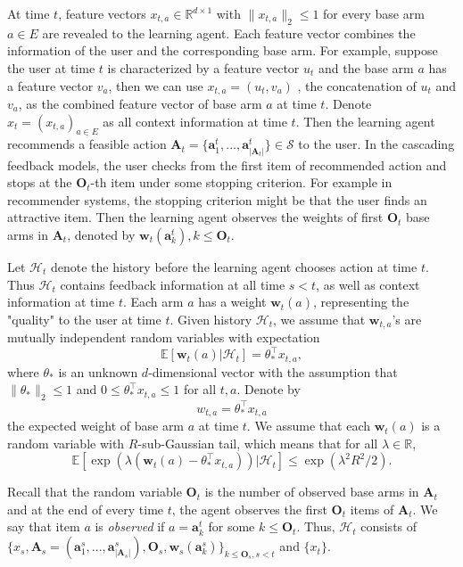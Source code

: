 \documentclass{article}
\newcommand{\EE}{\mathbb{E}}
\newcommand{\RR}{\mathbb{R}}
\newcommand{\bA}{\mathbf{A}}
\newcommand{\ba}{\mathbf{a}}
\newcommand{\bO}{\mathbf{O}}
\newcommand{\bw}{\mathbf{w}}
\newcommand{\cH}{\mathcal{H}}
\newcommand{\cS}{\mathcal{S}}
\newcommand{\abs}[1]{\left| #1 \right|}
\newcommand{\norm}[1]{\| #1 \|}
\begin{document}
At time $t$, feature vectors $x_{t,a} \in \RR^{d \times 1}$ with $\norm{x_{t,a}}_2 \leq 1$ for every base arm $a \in E$ are revealed to the learning agent. Each feature vector combines the information of the user and the corresponding base arm. For example, suppose the user at time $t$ is characterized by a feature vector $u_t$ and the base arm $a$ has a feature vector $v_a$, then we can use $x_{t,a} = (u_t, v_a)$ , the concatenation of $u_t$ and $v_a$, as the combined feature vector of base arm $a$ at time $t$. Denote $x_t = (x_{t,a})_{a \in E}$ as all context information at time $t$. Then the learning agent recommends a feasible action $\bA_t=\{ \ba_{1}^t,...,\ba_{\abs{\bA_t}}^t \} \in \cS$ to the user. In the cascading feedback models, the user checks from the first item of recommended action and stops at the $\bO_t$-th item under some stopping criterion. For example in recommender systems, the stopping criterion might be that the user finds an attractive item. Then the learning agent observes the weights of first $\bO_t$ base arms in $\bA_t$, denoted by $\bw_t(\ba_k^t), k \leq \bO_t$. 

Let $\cH_t$ denote the history before the learning agent chooses action at time $t$. Thus $\cH_t$ contains feedback information at all time $s < t$, as well as context information at time $t$. Each arm $a$ has a weight $\bw_t(a)$, representing the "quality" to the user at time $t$. Given history $\cH_t$, we assume that $\bw_{t,a}$'s are mutually independent random variables with expectation
\begin{equation} %
\label{eq:expectation}
\EE[\bw_{t}(a) | \cH_t] = \theta_{\ast}^{\top} x_{t,a},
\end{equation}
where $\theta_{\ast}$ is an unknown $d$-dimensional vector with the assumption that $\norm{\theta_{\ast}}_2 \leq 1$ and $0 \leq \theta_{\ast}^{\top} x_{t,a} \leq 1$ for all $t, a$. Denote by 
$$
w_{t,a} = \theta_{\ast}^{\top} x_{t,a}
$$
the expected weight of base arm $a$ at time $t$. We assume that each $\bw_{t}(a)$ is a random variable with $R$-sub-Gaussian tail, which means that for all $\lambda \in \RR$, 
$$
\EE[\exp(\lambda(\bw_{t}(a) - \theta_{\ast}^{\top} x_{t,a})) | \cH_t] \leq \exp(\lambda^2 R^2 / 2).
$$

Recall that the random variable $\bO_t$ is the number of observed base arms in $\bA_t$ and at the end of every time $t$, the agent observes the first $\bO_t$ items of $\bA_t$. We say that item $a$ is {\it observed} if $a = \ba_k^t$ for some $k \leq \bO_t$. Thus, $\cH_t$ consists of $\{x_s, \bA_s = (\ba_{1}^s,...,\ba_{\abs{\bA_s}}^s), \bO_s, \bw_s(\ba_k^s) \}_{k\leq \bO_s, s < t}$ and $\{x_t\}$.
\end{document}
